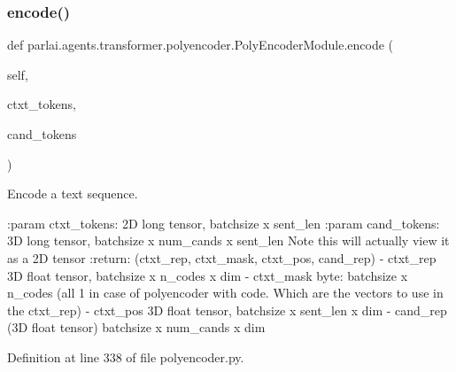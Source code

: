 \subsubsection{\texorpdfstring{encode()}{encode()}}
{\footnotesize\ttfamily def parlai.\+agents.\+transformer.\+polyencoder.\+Poly\+Encoder\+Module.\+encode (\begin{DoxyParamCaption}\item[{}]{self,  }\item[{}]{ctxt\+\_\+tokens,  }\item[{}]{cand\+\_\+tokens }\end{DoxyParamCaption})}

\begin{DoxyVerb}Encode a text sequence.

:param ctxt_tokens:
    2D long tensor, batchsize x sent_len
:param cand_tokens:
    3D long tensor, batchsize x num_cands x sent_len
    Note this will actually view it as a 2D tensor
:return:
    (ctxt_rep, ctxt_mask, ctxt_pos, cand_rep)
    - ctxt_rep 3D float tensor, batchsize x n_codes x dim
    - ctxt_mask byte:  batchsize x n_codes (all 1 in case
    of polyencoder with code. Which are the vectors to use
    in the ctxt_rep)
    - ctxt_pos 3D float tensor, batchsize x sent_len x dim
    - cand_rep (3D float tensor) batchsize x num_cands x dim
\end{DoxyVerb}
 

Definition at line 338 of file polyencoder.\+py.


